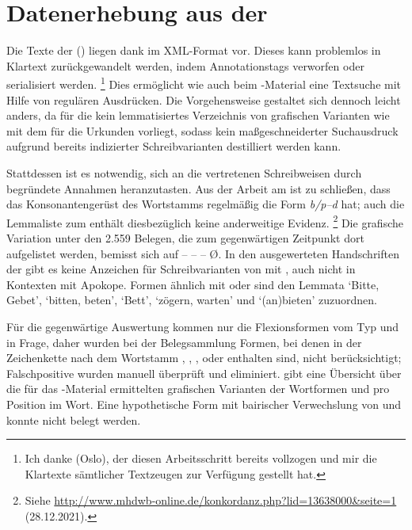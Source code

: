 
\section{Datenerhebung aus der }

Die Texte der  (\KC) liegen dank 
\autocite{kcdigital} im XML-Format vor. Dieses kann problemlos in Klartext
zurückgewandelt werden, indem Annotationstags verworfen oder serialisiert
werden.%
%
	\footnote{Ich danke  (Oslo), der diesen
	Arbeitsschritt bereits vollzogen und mir die Klartexte sämtlicher
	Textzeugen zur Verfügung gestellt hat.}
%
Dies ermöglicht wie auch beim \CAO{}-Material eine Textsuche mit Hilfe von
regulären Ausdrücken. Die Vorgehensweise gestaltet sich dennoch leicht anders,
da für die \KC{} kein lemmatisiertes Verzeichnis von grafischen Varianten wie
mit dem \WMU{} für die Urkunden vorliegt, sodass kein maßgeschneiderter
Suchausdruck aufgrund bereits indizierter Schreibvarianten destilliert werden
kann.

Stattdessen ist es notwendig, sich an die vertretenen Schreibweisen durch
begründete Annahmen heranzutasten. Aus der Arbeit am \CAO{} ist zu schließen,
dass das Konsonantengerüst des Wortstamms regelmäßig die Form \textit{b/p--d}
hat; auch die Lemmaliste zum  \autocite[s.\,v.~]{mwb1} enthält diesbezüglich keine
anderweitige Evidenz.%
%
	\footnote{Siehe
		\url{http://www.mhdwb-online.de/konkordanz.php?lid=13638000&seite=1}
		(28.12.2021).}
%
Die grafische Variation unter den 2.559 Belegen, die zum gegenwärtigen
Zeitpunkt dort aufgelistet werden, bemisst sich auf  --  --  --  Ø. In den ausgewerteten Handschriften der \KC{} gibt
es keine Anzeichen für Schreibvarianten von  mit , auch
nicht in Kontexten mit Apokope. Formen ähnlich  mit  oder
 sind den Lemmata  `Bitte, Gebet', 
`bitten, beten',  `Bett',  `zögern, warten' und
 `(an)bieten' zuzuordnen.

Für die gegenwärtige Auswertung kommen nur die Flexionsformen vom Typ 
und  in Frage, daher wurden bei der Belegsammlung Formen, bei denen
in der Zeichenkette nach dem Wortstamm , , , 
oder  enthalten sind, nicht berücksichtigt; Falschpositive wurden
manuell überprüft und eliminiert.  gibt eine Übersicht
über die für das \KC{}-Material ermittelten grafischen Varianten der Wortformen
 und  pro Position im Wort. Eine hypothetische Form
 mit bairischer Verwechslung von 
und  \autocite[153]{paul2007} konnte nicht belegt werden.

